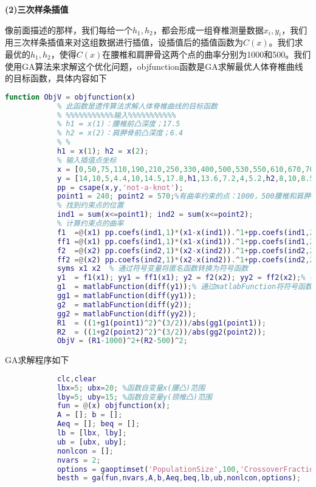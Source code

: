             \textbf{(2)三次样条插值}
            \par
            像前面描述的那样，我们每给一个$h_1,h_2$，都会形成一组脊椎测量数据$x_i,y_i$，我们用三次样条插值来对这组数据进行插值，设插值后的插值函数为$C(x)$。我们求最优的$h_1,h_2$，使得$C(x)$在腰椎和肩胛骨这两个点的曲率分别为1000和500。我们使用GA算法来求解这个优化问题，objfunction函数是GA求解最优人体脊椎曲线的目标函数，具体内容如下
            \begin{lstlisting}[language = Matlab]
            function ObjV = objfunction(x)
            % 此函数是遗传算法求解人体脊椎曲线的目标函数
            % %%%%%%%%%%%输入%%%%%%%%%%%
            % h1 = x(1)：腰椎前凸深度；17.5
            % h2 = x(2)：肩胛骨前凸深度；6.4
            % %
            h1 = x(1); h2 = x(2);
            % 输入插值点坐标
            x = [0,50,75,110,190,210,250,330,400,500,530,550,610,670,705,750,847];
            y = [14,10,5,4.4,10,14.5,17.8,h1,13.6,7.2,4,5.2,h2,8,10,8.5,5.6];
            pp = csape(x,y,'not-a-knot');
            point1 = 240; point2 = 570;%有曲率约束的点：1000，500腰椎和肩胛骨
            % 找到约束点的位置
            ind1 = sum(x<=point1); ind2 = sum(x<=point2);
            % 计算约束点的曲率
            f1  =@(x1) pp.coefs(ind1,1)*(x1-x(ind1)).^1+pp.coefs(ind1,2)*(x1-x(ind1)).^2+pp.coefs(ind1,3)*(x1-x(ind1)).^3+pp.coefs(ind1,4);
            ff1 =@(x1) pp.coefs(ind1,1)*(x1-x(ind1)).^1+pp.coefs(ind1,2)*(x1-x(ind1)).^2+pp.coefs(ind1,3)*(x1-x(ind1)).^3+pp.coefs(ind1,4);
            f2  =@(x2) pp.coefs(ind2,1)*(x2-x(ind2)).^1+pp.coefs(ind2,2)*(x2-x(ind2)).^2+pp.coefs(ind2,3)*(x2-x(ind2)).^3+pp.coefs(ind2,4);
            ff2 =@(x2) pp.coefs(ind2,1)*(x2-x(ind2)).^1+pp.coefs(ind2,2)*(x2-x(ind2)).^2+pp.coefs(ind2,3)*(x2-x(ind2)).^3+pp.coefs(ind2,4);
            syms x1 x2  % 通过符号变量将匿名函数转换为符号函数
            y1  = f1(x1); yy1 = ff1(x1); y2 = f2(x2); yy2 = ff2(x2);% 符号函数，可求导
            g1  = matlabFunction(diff(y1));% 通过matlabFunction将符号函数转换为匿名函数
            gg1 = matlabFunction(diff(yy1));
            g2  = matlabFunction(diff(y2));
            gg2 = matlabFunction(diff(yy2));
            R1  = ((1+g1(point1)^2)^(3/2))/abs(gg1(point1));
            R2  = ((1+g2(point2)^2)^(3/2))/abs(gg2(point2));
            ObjV = (R1-1000)^2+(R2-500)^2;
            \end{lstlisting}
            GA求解程序如下
            \begin{lstlisting}[language = Matlab]
            % 设脊椎曲线为分段三次样条函数，且在腰椎和肩胛骨的曲率为1000和500
            clc,clear
            lbx=5; ubx=20; %函数自变量x(腰凸)范围
            lby=5; uby=15; %函数自变量y(颈椎凸)范围
            fun = @(x) objfunction(x);
            A = []; b = [];
            Aeq = []; beq = [];
            lb = [lbx, lby];
            ub = [ubx, uby];
            nonlcon = [];
            nvars = 2;
            options = gaoptimset('PopulationSize',100,'CrossoverFraction',0.75,'Generations',20,'StallGenLimit',40,'PlotFcns',{@gaplotbestf,@gaplotbestindiv}); %参数设置
            besth = ga(fun,nvars,A,b,Aeq,beq,lb,ub,nonlcon,options);
            \end{lstlisting}
